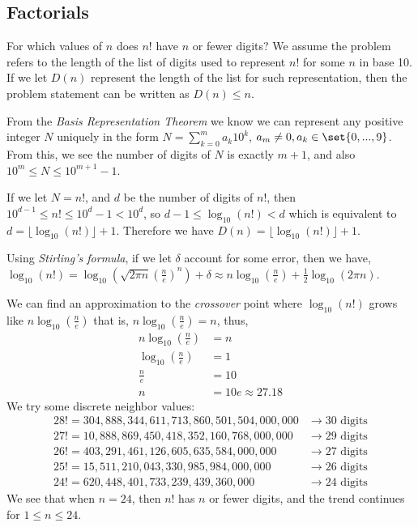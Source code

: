 \documentclass[DIN, pagenumber=false, fontsize=11pt, parskip=half]{scrartcl}
\begin{document}
\subsection{Factorials}

\begin{problems}
    \problem For which values of $n$ does $n!$ have $n$ or fewer digits?
    \answer We assume the problem refers to the length of the list of digits used to represent $n!$ for some $n$ in base 10. If we let $D(n)$ represent the length of the list for such representation, then the problem statement can be written as $D(n) \leq n$.

    From the \textit{Basis Representation Theorem} we know we can represent any positive integer $N$ uniquely in the form $N = \sum_{k=0}^{m}a_k10^k$, $a_m \neq 0, a_k \in \set{0,...,9}$. From this, we see the number of digits of $N$ is exactly $m+1$, and also $10^m \leq N \leq 10^{m+1}-1$.

    If we let $N = n!$, and $d$ be the number of digits of $n!$, then $10^{d-1} \leq n! \leq 10^d - 1 < 10^d$, so $d - 1 \leq \log_{10}(n!) < d$ which is equivalent to $d = \lfloor \log_{10}(n!) \rfloor + 1$. Therefore we have $D(n) = \lfloor \log_{10}(n!) \rfloor + 1$.

    Using \textit{Stirling's formula}, if we let $\delta$ account for some error, then we have, $\log_{10}(n!) = \log_{10}(\sqrt{2\pi n}(\frac{n}{e})^n) + \delta \approx n\log_{10}(\frac{n}{e}) + \frac{1}{2}\log_{10}(2\pi n)$.

    We can find an approximation to the \textit{crossover} point where $\log_{10}(n!)$ grows like $n\log_{10}(\frac{n}{e})$ that is, $n\log_{10}(\frac{n}{e}) = n$, thus,
    \begin{align}
        \nonumber n\log_{10}\left(\frac{n}{e}\right) & = n \\
        \nonumber \log_{10}\left(\frac{n}{e}\right) & = 1\\
        \nonumber \frac{n}{e} & = 10\\ 
        \nonumber n & = 10e \approx 27.18
    \end{align}
    We try some discrete neighbor values:
    \begin{align}
        \nonumber 28! = 304,888,344,611,713,860,501,504,000,000 & \rightarrow 30  \text{ digits}\\ 
        \nonumber 27! = 10,888,869,450,418,352,160,768,000,000 & \rightarrow 29 \text{ digits}\\ 
        \nonumber 26! = 403,291,461,126,605,635,584,000,000 & \rightarrow 27 \text{ digits}\\ 
        \nonumber 25! = 15,511,210,043,330,985,984,000,000 & \rightarrow 26 \text{ digits}\\
        \nonumber 24! = 620,448,401,733,239,439,360,000 & \rightarrow 24 \text{ digits}
    \end{align}
    We see that when $n = 24$, then $n!$ has $n$ or fewer digits, and the trend continues for $1 \leq n \leq 24$.



\end{problems}
\end{document}

